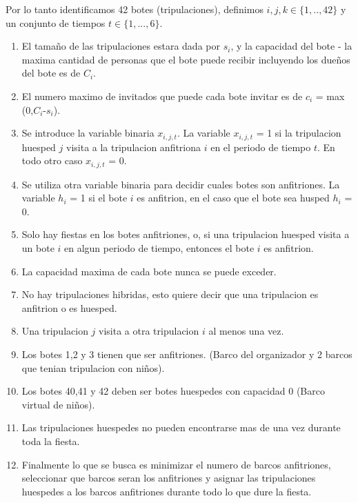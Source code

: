 \documentclass[spanish, fleqn]{article}
\begin{document}
\newpage

Por lo tanto identificamos 42 botes (tripulaciones), definimos $\mathit{i},\mathit{j},\mathit{k} \in \{1,..,42\}$ y un conjunto de tiempos $\mathit{t} \in \{1,...,6\}$.

\begin{enumerate}
\item El tamaño de las tripulaciones estara dada por $\mathit{s}_{\mathit{i}}$, y la capacidad del bote - la maxima cantidad de personas que el bote puede recibir incluyendo los dueños del bote es de $\mathit{C}_{\mathit{i}}$.

\item El numero maximo de invitados que puede cada bote invitar es de $\mathit{c}_{\mathit{i}}$ = max (0,$\mathit{C}_{\mathit{i}}$-$\mathit{s}_{\mathit{i}}$).

\item Se introduce la variable binaria $\mathit{x}_{\mathit{i},\mathit{j},\mathit{t}}$. La variable $\mathit{x}_{\mathit{i},\mathit{j},\mathit{t}}$ = 1 si la tripulacion huesped $\mathit{j}$ visita a la tripulacion anfitriona $\mathit{i}$ en el periodo de tiempo $\mathit{t}$. En todo otro caso $\mathit{x}_{\mathit{i},\mathit{j},\mathit{t}}$ = 0.

\item Se utiliza otra variable binaria para decidir cuales botes son anfitriones. La variable $\mathit{h}_{\mathit{i}}$ = 1 si el bote $\mathit{i}$ es anfitrion, en el caso que el bote sea husped $\mathit{h}_{\mathit{i}}$ = 0.

\item Solo hay fiestas en los botes anfitriones, o, si una tripulacion huesped visita a un bote $\mathit{i}$ en algun periodo de tiempo, entonces el bote $\mathit{i}$ es anfitrion.

\item La capacidad maxima de cada bote nunca se puede exceder.

\item No hay tripulaciones hibridas, esto quiere decir que una tripulacion es anfitrion o es huesped.

\item Una tripulacion $\mathit{j}$ visita a otra tripulacion $\mathit{i}$ al menos una vez.

\item Los botes 1,2 y 3 tienen que ser anfitriones. (Barco del organizador y 2 barcos que tenian tripulacion con niños).

\item Los botes 40,41 y 42 deben ser botes huespedes con capacidad 0 (Barco virtual de niños).

\item Las tripulaciones huespedes no pueden encontrarse mas de una vez durante toda la fiesta.

\item Finalmente lo que se busca es minimizar el numero de barcos anfitriones, seleccionar que barcos seran los anfitriones y asignar las tripulaciones huespedes a los barcos anfitriones durante todo lo que dure la fiesta.

\end{enumerate}
\end{document}
